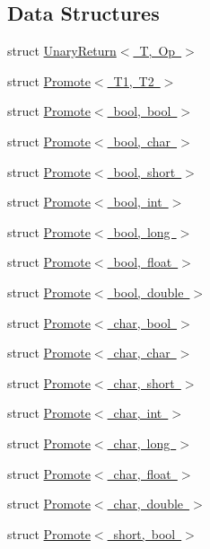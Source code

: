 \subsection*{Data Structures}
\begin{DoxyCompactItemize}
\item 
struct \mbox{\hyperlink{structUnaryReturn}{Unary\+Return$<$ T, Op $>$}}
\item 
struct \mbox{\hyperlink{structPromote}{Promote$<$ T1, T2 $>$}}
\item 
struct \mbox{\hyperlink{structPromote_3_01bool_00_01bool_01_4}{Promote$<$ bool, bool $>$}}
\item 
struct \mbox{\hyperlink{structPromote_3_01bool_00_01char_01_4}{Promote$<$ bool, char $>$}}
\item 
struct \mbox{\hyperlink{structPromote_3_01bool_00_01short_01_4}{Promote$<$ bool, short $>$}}
\item 
struct \mbox{\hyperlink{structPromote_3_01bool_00_01int_01_4}{Promote$<$ bool, int $>$}}
\item 
struct \mbox{\hyperlink{structPromote_3_01bool_00_01long_01_4}{Promote$<$ bool, long $>$}}
\item 
struct \mbox{\hyperlink{structPromote_3_01bool_00_01float_01_4}{Promote$<$ bool, float $>$}}
\item 
struct \mbox{\hyperlink{structPromote_3_01bool_00_01double_01_4}{Promote$<$ bool, double $>$}}
\item 
struct \mbox{\hyperlink{structPromote_3_01char_00_01bool_01_4}{Promote$<$ char, bool $>$}}
\item 
struct \mbox{\hyperlink{structPromote_3_01char_00_01char_01_4}{Promote$<$ char, char $>$}}
\item 
struct \mbox{\hyperlink{structPromote_3_01char_00_01short_01_4}{Promote$<$ char, short $>$}}
\item 
struct \mbox{\hyperlink{structPromote_3_01char_00_01int_01_4}{Promote$<$ char, int $>$}}
\item 
struct \mbox{\hyperlink{structPromote_3_01char_00_01long_01_4}{Promote$<$ char, long $>$}}
\item 
struct \mbox{\hyperlink{structPromote_3_01char_00_01float_01_4}{Promote$<$ char, float $>$}}
\item 
struct \mbox{\hyperlink{structPromote_3_01char_00_01double_01_4}{Promote$<$ char, double $>$}}
\item 
struct \mbox{\hyperlink{structPromote_3_01short_00_01bool_01_4}{Promote$<$ short, bool $>$}}
\item 

\end{DoxyCompactItemize}
